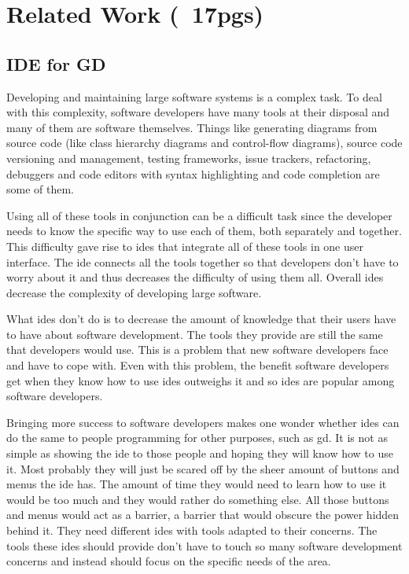 \documentclass{./llncs2e/llncs}
\begin{document}
\section{Related Work (~17pgs)}

\subsection{IDE for GD}
	Developing and maintaining large software systems is a complex task.
	To deal with this complexity, software developers have many tools at their disposal and many of them are software themselves.
	Things like generating diagrams from source code (like class hierarchy diagrams and control-flow diagrams), source code versioning and management, testing frameworks, issue trackers, refactoring, debuggers and code editors with syntax highlighting and code completion are some of them.

	Using all of these tools in conjunction can be a difficult task since the developer needs to know the specific way to use each of them, both separately and together.
	This difficulty gave rise to \ac{ide}s that integrate all of these tools in one user interface.
	The \ac{ide} connects all the tools together so that developers don't have to worry about it and thus decreases the difficulty of using them all.
	Overall \ac{ide}s decrease the complexity of developing large software.

	What \ac{ide}s don't do is to decrease the amount of knowledge that their users have to have about software development.
	The tools they provide are still the same that developers would use.
	This is a problem that new software developers face and have to cope with.
	Even with this problem, the benefit software developers get when they know how to use \ac{ide}s outweighs it and so \ac{ide}s are popular among software developers.

	Bringing more success to software developers makes one wonder whether \ac{ide}s can do the same to people programming for other purposes, such as \ac{gd}.
	It is not as simple as showing the \ac{ide} to those people and hoping they will know how to use it.
	Most probably they will just be scared off by the sheer amount of buttons and menus the \ac{ide} has.
	The amount of time they would need to learn how to use it would be too much and they would rather do something else.
	All those buttons and menus would act as a barrier, a barrier that would obscure the power hidden behind it.
	They need different \ac{ide}s with tools adapted to their concerns.
	The tools these \ac{ide}s should provide don't have to touch so many software development concerns and instead should focus on the specific needs of the area.
\end{document}
